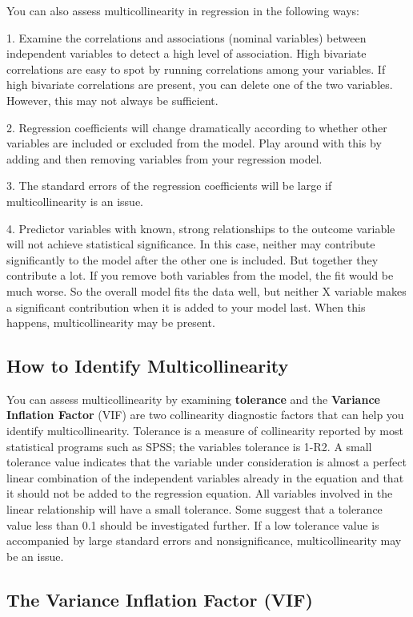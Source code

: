 \documentclass[12pt]{article}
\begin{document}
You can also assess multicollinearity in regression in the following ways:

1. Examine the correlations and associations (nominal variables) between independent variables to detect a high level of association. High bivariate correlations are easy to spot by running correlations among your variables. If high bivariate correlations are present, you can delete one of the two variables. However, this may not always be sufficient.

2. Regression coefficients will change dramatically according to whether other variables are included or excluded from the model. Play around with this by adding and then removing variables from your regression model.

3. The standard errors of the regression coefficients will be large if multicollinearity is an issue.

4. Predictor variables with known, strong relationships to the outcome variable will not achieve statistical significance. In this case, neither may contribute significantly to the model after the other one is included. But together they contribute a lot. If you remove both variables from the model, the fit would be much worse. So the overall model fits the data well, but neither X variable makes a significant contribution when it is added to your model last. When this happens, multicollinearity may be present.

\subsection{How to Identify Multicollinearity}


You can assess multicollinearity by examining \textbf{tolerance} and the \textbf{Variance Inflation Factor} (VIF) are two collinearity diagnostic factors that can help you identify multicollinearity. Tolerance is a measure of collinearity reported by most statistical programs such as SPSS; the variables tolerance is 1-R2. A small tolerance value indicates that the variable under consideration is almost a perfect linear combination of the independent variables already in the equation and that it should not be added to the regression equation. All variables involved in the linear relationship will have a small tolerance. Some suggest that a tolerance value less than 0.1 should be investigated further. If a low tolerance value is accompanied by large standard errors and nonsignificance, multicollinearity may be an issue.


\subsection{The Variance Inflation Factor (VIF)}
\end{document}
